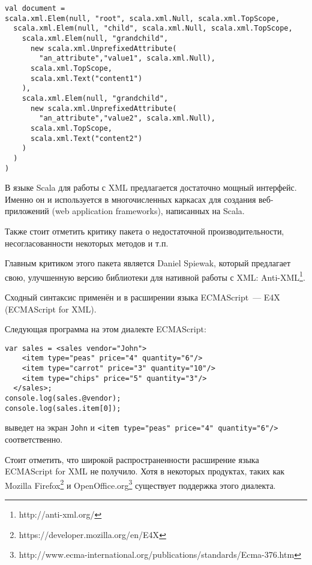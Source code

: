 \begin{lstlisting}[caption={Внутреннее представление XML литералов из~\ref{scala-xml-example}.}, label={scala-xml-example-internal}]
val document =
scala.xml.Elem(null, "root", scala.xml.Null, scala.xml.TopScope,
  scala.xml.Elem(null, "child", scala.xml.Null, scala.xml.TopScope,
    scala.xml.Elem(null, "grandchild",
      new scala.xml.UnprefixedAttribute(
        "an_attribute","value1", scala.xml.Null),
      scala.xml.TopScope,
      scala.xml.Text("content1")
    ),
    scala.xml.Elem(null, "grandchild",
      new scala.xml.UnprefixedAttribute(
        "an_attribute","value2", scala.xml.Null),
      scala.xml.TopScope,
      scala.xml.Text("content2")
    )
  )
) 
\end{lstlisting}

В языке Scala для работы с XML предлагается достаточно мощный интерфейс. Именно он и используется в многочисленных каркасах для создания веб-приложений (web application frameworks), написанных на Scala. \td

Также стоит отметить критику пакета  о недостаточной производительности, несогласованности некоторых методов и т.п.

Главным критиком этого пакета является Daniel Spiewak, который предлагает свою, улучшенную версию библиотеки для нативной работы с XML:
Anti-XML\footnote{http://anti-xml.org/}.

Сходный синтаксис применён и в расширении языка ECMAScript~--- E4X~\cite{E4X} (ECMAScript for XML).

Следующая программа на этом диалекте ECMAScript:

\begin{lstlisting}[caption={Пример использования XML литеров в языке ECMAScript for XML.}, label=e4x-xml-example]
var sales = <sales vendor="John">
    <item type="peas" price="4" quantity="6"/>
    <item type="carrot" price="3" quantity="10"/>
    <item type="chips" price="5" quantity="3"/>
  </sales>;
console.log(sales.@vendor);
console.log(sales.item[0]);
\end{lstlisting}
выведет на экран \texttt{John} и \texttt{<item type="peas" price="4" quantity="6"/>} соответственно.

Стоит отметить, что широкой распространенности расширение языка ECMAScript for XML не получило.
Хотя в некоторых продуктах, таких как Mozilla Firefox\footnote{https://developer.mozilla.org/en/E4X} и 
OpenOffice.org\footnote{http://www.ecma-international.org/publications/standards/Ecma-376.htm} существует поддержка этого диалекта.

